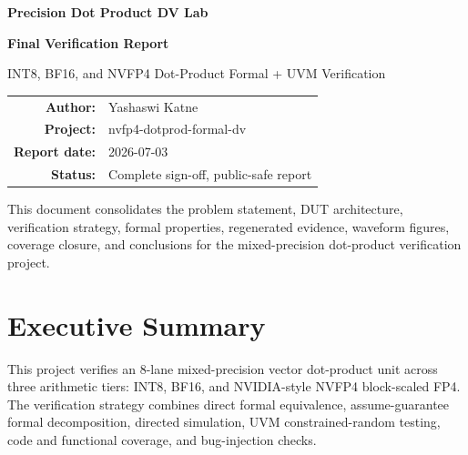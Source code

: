 \documentclass[11pt,oneside]{report}
\begin{document}
\begin{titlepage}
  \centering
  \vspace*{0.6in}
  {\Huge\bfseries\sffamily\color{navy} Precision Dot Product DV Lab\par}
  \vspace{0.16in}
  {\Large\bfseries Final Verification Report\par}
  \vspace{0.28in}
  {\large INT8, BF16, and NVFP4 Dot-Product Formal + UVM Verification\par}
  \vspace{0.45in}
  \begin{tabular}{rl}
    \textbf{Author:} & Yashaswi Katne \\
    \textbf{Project:} & nvfp4-dotprod-formal-dv \\
    \textbf{Report date:} & 2026-07-03 \\
    \textbf{Status:} & Complete sign-off, public-safe report \\
  \end{tabular}
  \vfill
  \begin{minipage}{0.82\textwidth}
  \centering
  This document consolidates the problem statement, DUT architecture,
  verification strategy, formal properties, regenerated evidence, waveform
  figures, coverage closure, and conclusions for the mixed-precision
  dot-product verification project.
  \end{minipage}
  \vfill
\end{titlepage}

\tableofcontents
\listoffigures
\listoftables
\clearpage

\chapter*{Executive Summary}

This project verifies an 8-lane mixed-precision vector dot-product unit across
three arithmetic tiers: INT8, BF16, and NVIDIA-style NVFP4 block-scaled FP4.
The verification strategy combines direct formal equivalence, assume-guarantee
formal decomposition, directed simulation, UVM constrained-random testing, code
and functional coverage, and bug-injection checks.
\end{document}
